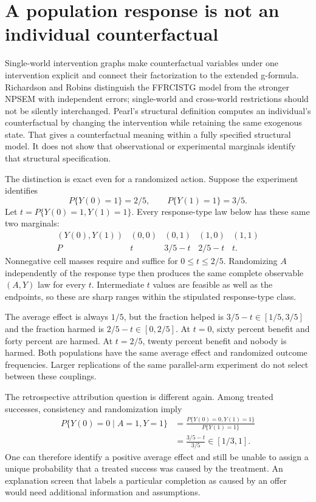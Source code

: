 \section{A population response is not an individual counterfactual}
\label{exec17:s3-coupling}

Single-world intervention graphs make counterfactual variables under
one intervention explicit and connect their factorization to the
extended g-formula. Richardson and Robins distinguish the FFRCISTG
model from the stronger NPSEM with independent errors; single-world
and cross-world restrictions should not be silently interchanged.
Pearl's structural definition computes an individual's counterfactual
by changing the intervention while retaining the same exogenous state.
That gives a counterfactual meaning within a fully specified structural
model. It does not show that observational or experimental marginals
identify that structural specification.~\citep{swig2013,pearl2009}

The distinction is exact even for a randomized action. Suppose the
experiment identifies
\[
 P\{Y(0)=1\}=2/5,\qquad P\{Y(1)=1\}=3/5.
\]
Let $t=P\{Y(0)=1,Y(1)=1\}$. Every response-type law below has these
same two marginals:
\[
\begin{array}{c|cccc}
(Y(0),Y(1))&(0,0)&(0,1)&(1,0)&(1,1)\\ \hline
P&t&3/5-t&2/5-t&t .
\end{array}
\]
Nonnegative cell masses require and suffice for $0\le t\le2/5$.
Randomizing $A$ independently of the response type then produces
the same complete observable $(A,Y)$ law for every $t$.
Intermediate $t$ values are feasible as well as the endpoints,
so these are sharp ranges within the stipulated response-type
class.~\citep{exec17_s3_exact}

The average effect is always $1/5$, but the fraction helped is
$3/5-t\in[1/5,3/5]$ and the fraction harmed is
$2/5-t\in[0,2/5]$. At $t=0$, sixty percent benefit and forty
percent are harmed. At $t=2/5$, twenty percent benefit and nobody
is harmed. Both populations have the same average effect and
randomized outcome frequencies. Larger replications of the same
parallel-arm experiment do not select between these couplings.

The retrospective attribution question is different again. Among
treated successes, consistency and randomization imply
\begin{align*}
 P\{Y(0)=0\mid A=1,Y=1\}
 &=\frac{P\{Y(0)=0,Y(1)=1\}}{P\{Y(1)=1\}}\\
 &=\frac{3/5-t}{3/5}\in[1/3,1].
\end{align*}
One can therefore identify a positive average effect and still be
unable to assign a unique probability that a treated success was
caused by the treatment. An explanation screen that labels a
particular completion as caused by an offer would need additional
information and assumptions.

